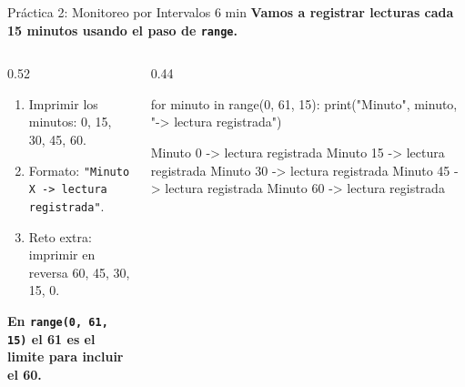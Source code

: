 \documentclass[aspectratio=169, 11pt]{beamer}
\begin{document}
\begin{frame}[fragile,shrink=30]{Práctica 2: Monitoreo por Intervalos \hfill {\normalsize\color{arcaRed}\faClock\hspace{4pt}6 min}}
  \vspace{-6pt}
  {\small\color{arcaDark}\bfseries
    Vamos a registrar lecturas cada 15 minutos usando el paso de \texttt{range}.}

  \vspace{6pt}
  \begin{columns}[T]
    \begin{column}{0.52\textwidth}
      {\footnotesize\color{textMuted}
      \begin{enumerate}\setlength{\itemsep}{3pt}
        \item[{\color{arcaRed}\bfseries 1.}]
          Imprimir los minutos: 0, 15, 30, 45, 60.
        \item[{\color{arcaRed}\bfseries 2.}]
          Formato:
          \texttt{"Minuto X -> lectura registrada"}.
        \item[{\color{arcaRed}\bfseries 3.}]
          Reto extra: imprimir en reversa
          60, 45, 30, 15, 0.
      \end{enumerate}
      }

      \vspace{6pt}
      {\scriptsize\color{arcaRed}\bfseries
        \faExclamationTriangle\hspace{4pt}
        En \texttt{range(0, 61, 15)} el 61 es el limite
        para incluir el 60.}
    \end{column}

    \begin{column}{0.44\textwidth}
      \begin{pyblock}
for minuto in range(0, 61, 15):
    print("Minuto", minuto, "-> lectura registrada")
      \end{pyblock}
      \vspace{-2pt}
      \begin{outputblock}
Minuto 0 -> lectura registrada
Minuto 15 -> lectura registrada
Minuto 30 -> lectura registrada
Minuto 45 -> lectura registrada
Minuto 60 -> lectura registrada
      \end{outputblock}
    \end{column}
  \end{columns}
\end{frame}
\end{document}
